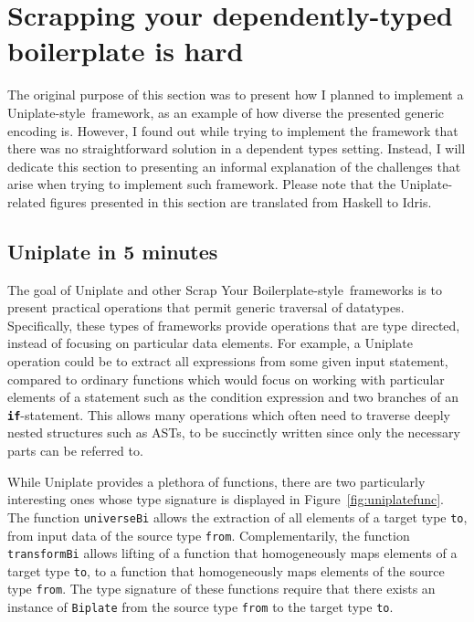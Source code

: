 \documentclass{ituthesis}
\newcommand{\tttype}[1]{\textcolor{type-color}{\texttt{#1}}}
\newcommand{\ttdec}[1]{\textcolor{declared-var-color}{\texttt{#1}}}
\newcommand{\ttvar}[1]{\textcolor{local-var-color}{\texttt{#1}}}
\theoremstyle{break}
\begin{document}
\section{Scrapping your dependently-typed boilerplate is hard}
\label{sec:Scrappingyourdependently-typedboilerplateishard}
The original purpose of this section was to present how I planned to implement a Uniplate-style\,\autocite{mitchell2007uniform} framework, as an example of how diverse the presented generic encoding is.
However, I found out while trying to implement the framework that there was no straightforward solution in a dependent types setting.
Instead, I will dedicate this section to presenting an informal explanation of the challenges that arise when trying to implement such framework.
Please note that the Uniplate-related figures presented in this section are translated from Haskell to Idris.

\subsection{Uniplate in 5 minutes}
\label{sub:Uniplate in 5 minutes}

The goal of Uniplate and other Scrap Your Boilerplate-style\,\autocite{lammel2003scrap} frameworks is to present practical operations that permit generic traversal of datatypes.
Specifically, these types of frameworks provide operations that are type directed, instead of focusing on particular data elements.
For example, a Uniplate operation could be to extract all expressions from some given input statement, compared to ordinary functions which would focus on working with particular elements of a statement such as the condition expression and two branches of an \texttt{\textbf{if}}-statement.
This allows many operations which often need to traverse deeply nested structures such as ASTs, to be succinctly written since only the necessary parts can be referred to.

While Uniplate provides a plethora of functions, there are two particularly interesting ones whose type signature is displayed in Figure~\ref{fig:uniplatefunc}.
The function \ttdec{universeBi} allows the extraction of all elements of a target type \ttvar{to}, from input data of the source type \ttvar{from}.
Complementarily, the function \ttdec{transformBi} allows lifting of a function that homogeneously maps elements of a target type \ttvar{to}, to a function that homogeneously maps elements of the source type \ttvar{from}.
The type signature of these functions require that there exists an instance of \tttype{Biplate} from the source type \tttype{from} to the target type \tttype{to}.
\end{document}
